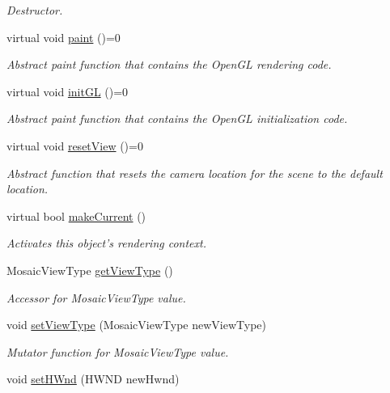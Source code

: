 \begin{DoxyCompactItemize}
\begin{DoxyCompactList}\small\item\em Destructor. \end{DoxyCompactList}\item 
virtual void \hyperlink{class_mosaic_base_a7896df52ec0fe72fad2c51b65ec10751}{paint} ()=0
\begin{DoxyCompactList}\small\item\em Abstract paint function that contains the OpenGL rendering code. \end{DoxyCompactList}\item 
virtual void \hyperlink{class_mosaic_base_acaa9d026932ab6e17b1bf70552a2ed66}{initGL} ()=0
\begin{DoxyCompactList}\small\item\em Abstract paint function that contains the OpenGL initialization code. \end{DoxyCompactList}\item 
virtual void \hyperlink{class_mosaic_base_a633c3604b2a5b4672baaa22d0b610095}{resetView} ()=0
\begin{DoxyCompactList}\small\item\em Abstract function that resets the camera location for the scene to the default location. \end{DoxyCompactList}\item 
virtual bool \hyperlink{class_mosaic_base_ae5ba0fe64d0664c7fd4c6f783f3f1701}{makeCurrent} ()
\begin{DoxyCompactList}\small\item\em Activates this object's rendering context. \end{DoxyCompactList}\item 
MosaicViewType \hyperlink{class_mosaic_base_a4869a3db601bf263770518d2ca6528fd}{getViewType} ()
\begin{DoxyCompactList}\small\item\em Accessor for MosaicViewType value. \end{DoxyCompactList}\item 
void \hyperlink{class_mosaic_base_a8292be2cea305151314a6721207fef4b}{setViewType} (MosaicViewType newViewType)
\begin{DoxyCompactList}\small\item\em Mutator function for MosaicViewType value. \end{DoxyCompactList}\item 
void \hyperlink{class_mosaic_base_a1344fd9c7a396e630b0c44328b24ef52}{setHWnd} (HWND newHwnd)

\end{DoxyCompactItemize}
